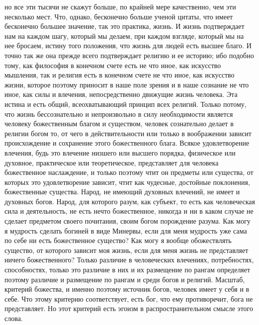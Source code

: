 \documentclass[12pt]{article}
\begin{document}
но все эти тысячи не скажут больше, по крайней мере качественно, чем эти несколько мест. Что, однако, бесконечно больше ученой цитаты, что имеет бесконечно большее значение, так это практика, жизнь. И жизнь подтверждает нам на каждом шагу, который мы делаем, при каждом взгляде, который мы на нее бросаем, истину того положения, что жизнь для людей есть высшее благо. И точно так же она прежде всего подтверждает религию и ее историю; ибо подобно тому, как философия в конечном счете есть не что иное, как искусство мышления, так и религия есть в конечном счете не что иное, как искусство жизни, которое поэтому приносит в наше поле зрения и в наше сознание не что иное, как силы и влечения, непосредственно движущие жизнь человека. Эта истина и есть общий, всеохватывающий принцип всех религий. Только потому, что жизнь бессознательно и непроизвольно в силу необходимости является человеку божественным благом и существом, человек сознательно делает в религии богом то, от чего в действительности или только в воображении зависит происхождение и сохранение этого божественного блага. Всякое удовлетворение влечения, будь это влечение низшего или высшего порядка, физическое или духовное, практическое или теоретическое, представляет для человека божественное наслаждение, и только поэтому чтит он предметы или существа, от которых это удовлетворение зависит, чтит как чудесные, достойные поклонения, божественные существа. Народ, не имеющий духовных влечений, не имеет и духовных богов. Народ, для которого разум, как субъект, то есть как человеческая сила и деятельность, не есть нечто божественное, никогда и ни в каком случае не сделает предметом своего почитания, своим богом порождение разума. Как могу я мудрость сделать богиней в виде Минервы, если для меня мудрость уже сама по себе ни есть божественное существо? Как могу я вообще обожествлять существо, от которого зависит моя жизнь, если для меня жизнь не представляет ничего божественного? Только различие в человеческих влечениях, потребностях, способностях, только это различие в них и их размещение по рангам определяет поэтому различие и размещение по рангам и среди богов и религий. Масштаб, критерий божества, и именно поэтому источник богов, человек имеет у себя и в себе. Что этому критерию соответствует, есть бог, что ему противоречит, бога не представляет. Но этот критерий есть эгоизм в распространительном смысле этого слова. 
\end{document}
